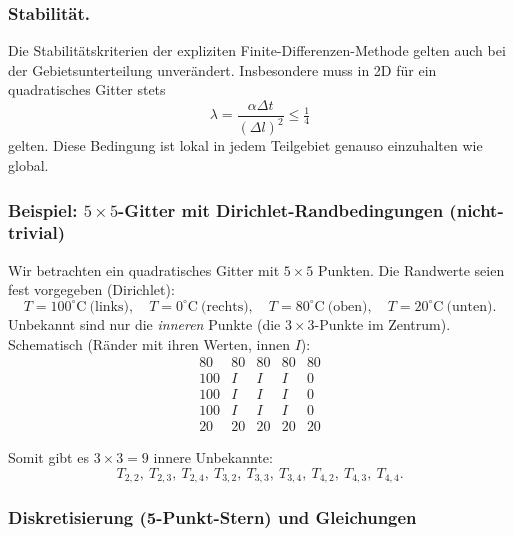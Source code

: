 \subsubsection {Stabilität.}
Die Stabilitätskriterien der expliziten Finite-Differenzen-Methode gelten auch bei der Gebietsunterteilung unverändert.  
Insbesondere muss in 2D für ein quadratisches Gitter stets
\[
\lambda = \frac{\alpha \Delta t}{(\Delta l)^2} \leq \tfrac{1}{4}
\]
gelten.  
Diese Bedingung ist lokal in jedem Teilgebiet genauso einzuhalten wie global.  



\subsubsection*{Beispiel: $5\times 5$-Gitter mit Dirichlet-Randbedingungen (nicht-trivial)}

Wir betrachten ein quadratisches Gitter mit $5\times 5$ Punkten.  
Die Randwerte seien fest vorgegeben (Dirichlet):
\[
T=100^\circ\mathrm{C}\ \text{(links)},\quad
T=0^\circ\mathrm{C}\ \text{(rechts)},\quad
T=80^\circ\mathrm{C}\ \text{(oben)},\quad
T=20^\circ\mathrm{C}\ \text{(unten)}.
\]
Unbekannt sind nur die \emph{inneren} Punkte (die $3\times 3$-Punkte im Zentrum).
Schematisch (Ränder mit ihren Werten, innen $I$):
\[
\begin{array}{ccccc}
	80 & 80 & 80 & 80 & 80 \\
	100 & I & I & I & 0 \\
	100 & I & I & I & 0 \\
	100 & I & I & I & 0 \\
	20 & 20 & 20 & 20 & 20
\end{array}
\]

Somit gibt es $3\times 3 = 9$ innere Unbekannte:
\[
T_{2,2},\ T_{2,3},\ T_{2,4},\ T_{3,2},\ T_{3,3},\ T_{3,4},\ T_{4,2},\ T_{4,3},\ T_{4,4}.
\]

\subsubsection*{Diskretisierung (5-Punkt-Stern) und Gleichungen}

